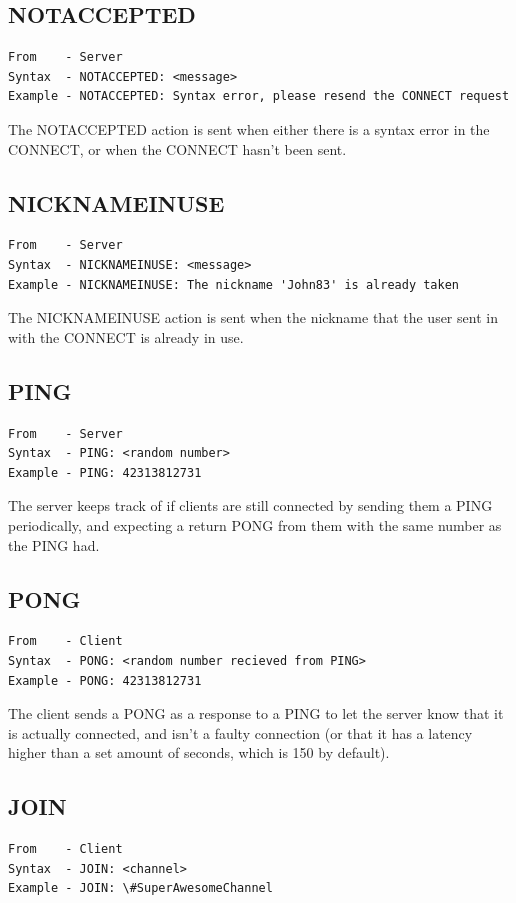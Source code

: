 \documentclass[12pt]{rapport}
\begin{document}
\subsection*{NOTACCEPTED}
\begin{verbatim}
From    - Server
Syntax  - NOTACCEPTED: <message>
Example - NOTACCEPTED: Syntax error, please resend the CONNECT request
\end{verbatim}

\noindent The NOTACCEPTED action is sent when either there is a syntax
error in the CONNECT, or when the CONNECT hasn't been sent.

\subsection*{NICKNAMEINUSE}
\begin{verbatim}
From    - Server
Syntax  - NICKNAMEINUSE: <message>
Example - NICKNAMEINUSE: The nickname 'John83' is already taken
\end{verbatim}

\noindent The NICKNAMEINUSE action is sent when the nickname that the
user sent in with the CONNECT is already in use.

\subsection*{PING}
\begin{verbatim}
From    - Server
Syntax  - PING: <random number>
Example - PING: 42313812731
\end{verbatim}

\noindent The server keeps track of if clients are still connected by
sending them a PING periodically, and expecting a return PONG from
them with the same number as the PING had.

\subsection*{PONG}
\begin{verbatim}
From    - Client
Syntax  - PONG: <random number recieved from PING>
Example - PONG: 42313812731
\end{verbatim}

\noindent The client sends a PONG as a response to a PING to let the
server know that it is actually connected, and isn't a faulty
connection (or that it has a latency higher than a set amount of
seconds, which is 150 by default).

\subsection*{JOIN}
\begin{verbatim}
From    - Client
Syntax  - JOIN: <channel>
Example - JOIN: \#SuperAwesomeChannel
\end{verbatim}
\end{document}
